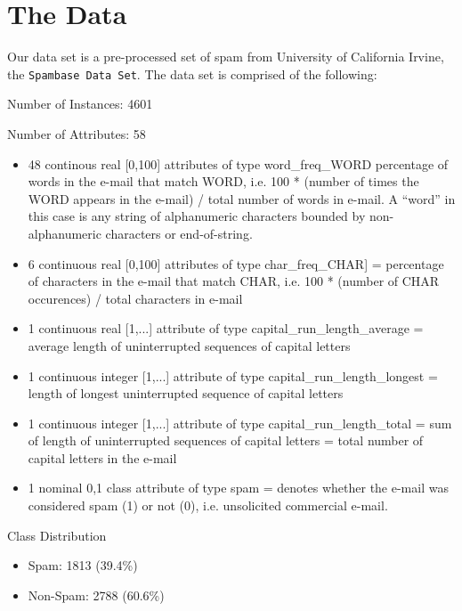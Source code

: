 \documentclass[10pt,letterpaper,onecolumn,draftclsnofoot]{IEEEtran}
\begin{document}
\section{The Data}
Our data set is a pre-processed set of spam from University of California Irvine,
the \texttt{Spambase Data Set}.\cite{spambase} The data set is comprised of the
following:
\begin{description}
  \item Number of Instances: 4601
  \item Number of Attributes: 58
  \begin{itemize}
    \item 48 continous real [0,100] attributes of type word\_freq\_WORD
    percentage of words in the e-mail that match WORD, i.e. 100 * (number of
    times the WORD appears in the e-mail) / total number of words in e-mail. A
    ``word'' in this case is any string of alphanumeric characters bounded by
    non-alphanumeric characters or end-of-string.

    \item 6 continuous real [0,100] attributes of type char\_freq\_CHAR]
    = percentage of characters in the e-mail that match CHAR, i.e. 100 *
    (number of CHAR occurences) / total characters in e-mail

    \item 1 continuous real [1,...] attribute of type capital\_run\_length\_average
    = average length of uninterrupted sequences of capital letters

    \item 1 continuous integer [1,...] attribute of type capital\_run\_length\_longest
    = length of longest uninterrupted sequence of capital letters

    \item 1 continuous integer [1,...] attribute of type capital\_run\_length\_total
    = sum of length of uninterrupted sequences of capital letters
    = total number of capital letters in the e-mail

    \item 1 nominal {0,1} class attribute of type spam
    = denotes whether the e-mail was considered spam (1) or not (0), i.e.
    unsolicited commercial e-mail.
  \end{itemize}
  \item Class Distribution
  \begin{itemize}
      \item Spam: 1813 (39.4\%)
      \item Non-Spam: 2788 (60.6\%)
  \end{itemize}
\end{description}
\end{document}
